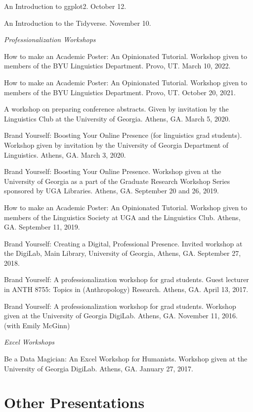 \documentclass[
]{article}
\begin{document}
An Introduction to ggplot2. October 12.

An Introduction to the Tidyverse. November 10.

\emph{Professionalization Workshops}

How to make an Academic Poster: An Opinionated Tutorial. Workshop given
to members of the BYU Linguistics Department. Provo, UT. March 10, 2022.

How to make an Academic Poster: An Opinionated Tutorial. Workshop given
to members of the BYU Linguistics Department. Provo, UT. October 20,
2021.

A workshop on preparing conference abstracts. Given by invitation by the
Linguistics Club at the University of Georgia. Athens, GA. March 5,
2020.

Brand Yourself: Boosting Your Online Presence (for linguistics grad
students). Workshop given by invitation by the University of Georgia
Department of Linguistics. Athens, GA. March 3, 2020.

Brand Yourself: Boosting Your Online Presence. Workshop given at the
University of Georgia as a part of the Graduate Research Workshop Series
sponsored by UGA Libraries. Athens, GA. September 20 and 26, 2019.

How to make an Academic Poster: An Opinionated Tutorial. Workshop given
to members of the Linguistics Society at UGA and the Linguistics Club.
Athens, GA. September 11, 2019.

Brand Yourself: Creating a Digital, Professional Presence. Invited
workshop at the DigiLab, Main Library, University of Georgia, Athens,
GA. September 27, 2018.

Brand Yourself: A professionalization workshop for grad students. Guest
lecturer in ANTH 8755: Topics in (Anthropology) Research. Athens, GA.
April 13, 2017.

Brand Yourself: A professionalization workshop for grad students.
Workshop given at the University of Georgia DigiLab. Athens, GA.
November 11, 2016. (with Emily McGinn)

\emph{Excel Workshops}

Be a Data Magician: An Excel Workshop for Humanists. Workshop given at
the University of Georgia DigiLab. Athens, GA. January 27, 2017.

\hypertarget{other-presentations}{%
\section{Other Presentations}\label{other-presentations}}
\end{document}
